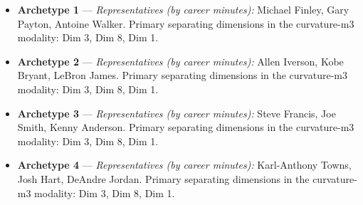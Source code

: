 \begin{itemize}
\item \textbf{Archetype 1} --- \emph{Representatives (by career minutes):} Michael Finley, Gary Payton, Antoine Walker. Primary separating dimensions in the curvature-m3 modality: Dim 3, Dim 8, Dim 1.
\item \textbf{Archetype 2} --- \emph{Representatives (by career minutes):} Allen Iverson, Kobe Bryant, LeBron James. Primary separating dimensions in the curvature-m3 modality: Dim 3, Dim 8, Dim 1.
\item \textbf{Archetype 3} --- \emph{Representatives (by career minutes):} Steve Francis, Joe Smith, Kenny Anderson. Primary separating dimensions in the curvature-m3 modality: Dim 3, Dim 8, Dim 1.
\item \textbf{Archetype 4} --- \emph{Representatives (by career minutes):} Karl-Anthony Towns, Josh Hart, DeAndre Jordan. Primary separating dimensions in the curvature-m3 modality: Dim 3, Dim 8, Dim 1.
\end{itemize}
